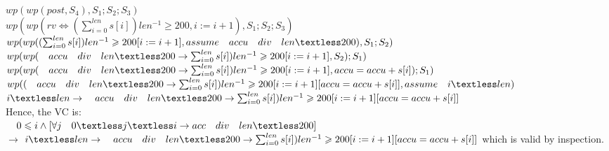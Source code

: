 \documentclass[]{article}
\begin{document}
	$wp(wp(post,S_4),S_1;S_2;S_3)$\\
	$wp(wp(rv \Leftrightarrow (\sum_{i=0}^{len} s[i])len^{-1} \geqslant 200,i:=i+1),S_1;S_2;S_3)$\\
	$wp(wp((\sum_{i=0}^{len} s[i])len^{-1} \geqslant 200[i:=i+1],assume\quad accu \quad div \quad len \textless 200),S_1;S_2)$\\
	$wp(wp(\quad accu \quad div \quad len \textless 200 \rightarrow \sum_{i=0}^{len} s[i])len^{-1} \geqslant 200[i:=i+1],S_2);S_1)$\\
	$wp(wp(\quad accu \quad div \quad len \textless 200 \rightarrow \sum_{i=0}^{len} s[i])len^{-1} \geqslant 200[i:=i+1],accu=accu+s[i]);S_1)$\\
	$wp((\quad accu \quad div \quad len \textless 200 \rightarrow \sum_{i=0}^{len} s[i])len^{-1} \geqslant 200[i:=i+1][accu=accu+s[i]],assume\quad i \textless len)$\\
	$i \textless len \rightarrow \quad accu \quad div \quad len \textless 200 \rightarrow \sum_{i=0}^{len} s[i])len^{-1} \geqslant 200[i:=i+1][accu=accu+s[i]] $\\
	Hence, the VC is:\\
	$\quad0 \leqslant i \wedge [\forall j \quad0 \textless j \textless i \rightarrow acc\quad div\quad len \textless 200]$\\
	$\rightarrow$ $i \textless len \rightarrow \quad accu \quad div \quad len \textless 200 \rightarrow \sum_{i=0}^{len} s[i])len^{-1} \geqslant 200[i:=i+1][accu=accu+s[i]]$
	which is valid by inspection.
\end{document}
